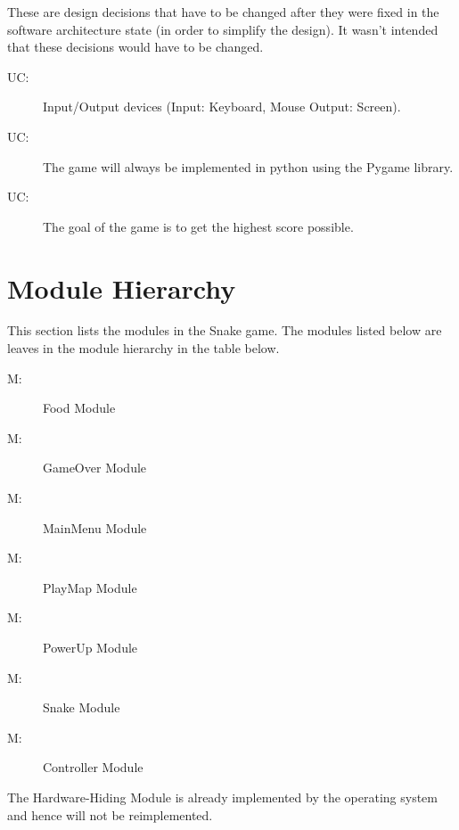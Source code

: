 \documentclass[12pt]{article}
\newcounter{ucnum}
\newcommand{\uctheucnum}{UC\theucnum}
\newcounter{mnum}
\newcommand{\mthemnum}{M\themnum}
\begin{document}
These are design decisions that have to be changed after they were fixed in the software architecture state (in order to simplify the design). It wasn't intended that these decisions would have to be changed.

\begin{description}
\item[ \uctheucnum \label{ucIO}:] Input/Output devices
  (Input: Keyboard, Mouse Output: Screen).
\item[ \uctheucnum \label{ucPygame}:] The game will always be implemented in python using the Pygame library.
\item[ \uctheucnum \label{ucGoal}:] The goal of the game is to get the highest score possible.
\end{description}

\section{Module Hierarchy} \label{SecMH}

This section lists the modules in the Snake game. The modules listed below are leaves in the module hierarchy in the table below. 

\begin{description}
\item [ \mthemnum \label{mFood}:] Food Module
\item [ \mthemnum \label{mGameOver}:] GameOver Module
\item [ \mthemnum \label{mMainMenu}:] MainMenu Module
\item [ \mthemnum \label{mPlayMap}:] PlayMap Module
\item [ \mthemnum \label{mPowerUp}:] PowerUp Module
\item [ \mthemnum \label{mSnake}:] Snake Module
\item [ \mthemnum \label{mController}:] Controller Module
\end{description}

The Hardware-Hiding Module is already implemented by the operating system and hence will not be reimplemented.
\end{document}
